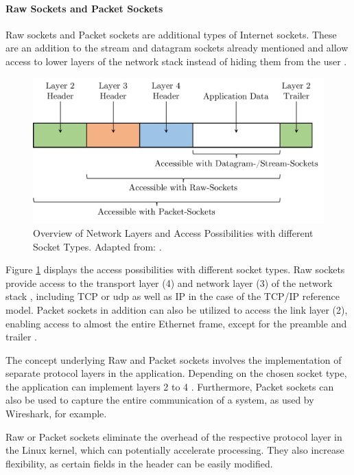 \paragraph{Raw Sockets and Packet Sockets}

Raw sockets and Packet sockets are additional types of Internet sockets. These are an addition to the stream and datagram sockets already mentioned and allow access to lower layers of the network stack instead of hiding them from the user \cite{sock07}.

\begin{figure}[h]
    \centering
    \includegraphics[width=0.9\linewidth]{figures/linux_nwstack/image02.pdf}
    \caption[Overview of Network Layers and Access Possibilities with different Socket Types]{Overview of Network Layers and Access Possibilities with different Socket Types. Adapted from: \cite{sock07}.}
    \label{fig:SocketAccessPossib}
\end{figure}

Figure \ref{fig:SocketAccessPossib} displays the access possibilities with different socket types. Raw sockets provide access to the transport layer (4) and network layer (3) of the network stack \cite{sock08}, including TCP or \ac{udp} as well as IP in the case of the TCP/IP reference model. Packet sockets in addition can also be utilized to access the link layer (2), enabling access to almost the entire Ethernet frame, except for the preamble and trailer \cite{sock09}.

The concept underlying Raw and Packet sockets involves the implementation of separate protocol layers in the application. Depending on the chosen socket type, the application can implement layers 2 to 4 \cite{sock08}. Furthermore, Packet sockets can also be used to capture the entire communication of a system, as used by Wireshark, for example.

Raw or Packet sockets eliminate the overhead of the respective protocol layer in the Linux kernel, which can potentially accelerate processing. They also increase flexibility, as certain fields in the header can be easily modified.

